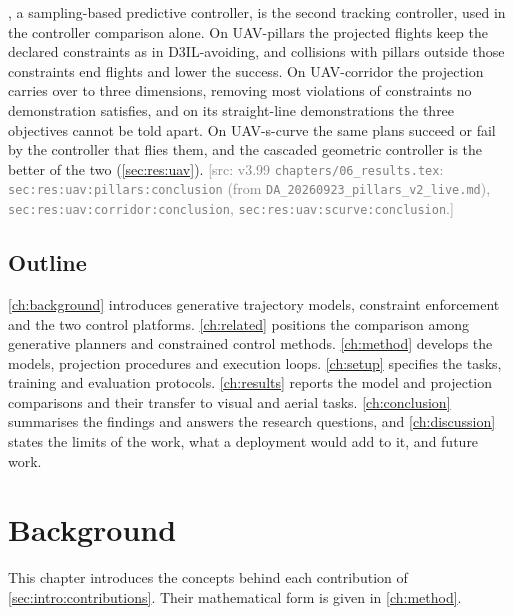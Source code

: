 \documentclass[headsepline,footsepline,footinclude=false,oneside,fontsize=11pt,paper=a4,listof=totoc,bibliography=totoc]{scrbook}
\theoremstyle{definition}
\theoremstyle{plain}
\theoremstyle{remark}
\newif\ifsubmission
\newcommand{\srcnote}[1]{\ifsubmission\else\textcolor{gray}{\footnotesize\textsf{[src: #1]}}\fi}
\begin{document}
\begin{enumerate}
    \parencite{howell2022predictive}, a sampling-based predictive controller, is the second tracking
    controller, used in the controller comparison alone.
    On UAV-pillars the projected flights keep the declared constraints as in D3IL-avoiding, and
    collisions with pillars outside those constraints end flights and lower the success. On
    UAV-corridor the projection carries over to three dimensions, removing most violations of
    constraints no demonstration satisfies, and on its straight-line demonstrations the three
    objectives cannot be told apart. On UAV-s-curve the same plans succeed or fail by the controller
    that flies them, and the cascaded geometric controller is the better of the two
    (\autoref{sec:res:uav}).
    \srcnote{v3.99 \texttt{chapters/06\_results.tex}: \texttt{sec:res:uav:pillars:conclusion}
    (from \texttt{DA\_20260923\_pillars\_v2\_live.md}), \texttt{sec:res:uav:corridor:conclusion},
    \texttt{sec:res:uav:scurve:conclusion}.}
\end{enumerate}

\section{Outline}\label{sec:intro:outline}

\autoref{ch:background} introduces generative trajectory models, constraint enforcement and the two
control platforms. \autoref{ch:related} positions the comparison among generative planners and
constrained control methods. \autoref{ch:method} develops the models, projection procedures and
execution loops. \autoref{ch:setup} specifies the tasks, training and evaluation protocols.
\autoref{ch:results} reports the model and projection comparisons and their transfer to visual and
aerial tasks. \autoref{ch:conclusion} summarises the findings and answers the research questions, and
\autoref{ch:discussion} states the limits of the work, what a deployment would add to it, and future
work.

\chapter{Background}\label{ch:background}

This chapter introduces the concepts behind each contribution of \autoref{sec:intro:contributions}.
Their mathematical form is given in \autoref{ch:method}.
\end{document}
